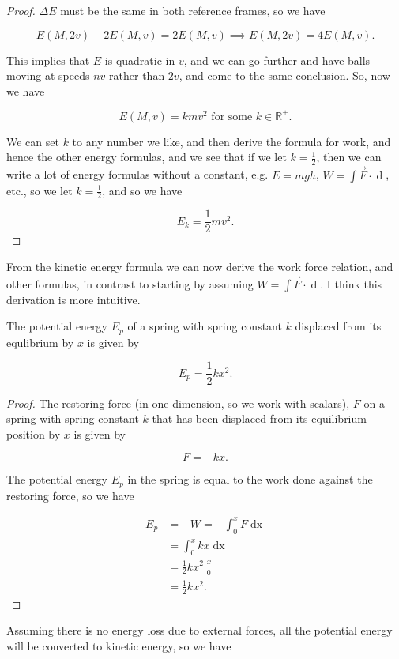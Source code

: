 \documentclass{homework}
\begin{document}
\begin{proof}
$\Delta E$ must be the same in both reference frames, so we have

\begin{equation*}
    E(M, 2v) - 2E(M, v) = 2E(M, v) \implies E(M, 2v) = 4E(M, v).
\end{equation*}

This implies that $E$ is quadratic in $v$, and we can go further and have balls moving at speeds $nv$ rather than $2v$, and come to the same conclusion. So, now we have

\begin{equation*}
    E(M, v) = kmv^2 \text{ for some $k\in\mathbb{R^+}$}.
\end{equation*}

We can set $k$ to any number we like, and then derive the formula for work, and hence the other energy formulas, and we see that if we let $k = \frac{1}{2}$, then we can write a lot of energy formulas without a constant, e.g. $E = mgh$, $W = \int \vec{F} \cdot \mathop{d\vec{r}}$, etc., so we let $k = \frac{1}{2}$, and so we have

\begin{equation*}
    E_k = \frac{1}{2}mv^2.
\end{equation*}
\end{proof}
From the kinetic energy formula we can now derive the work force relation, and other formulas, in contrast to starting by assuming $W = \int \vec{F} \cdot \mathop{d\vec{r}}$. I think this derivation is more intuitive.

The potential energy $E_p$ of a spring with spring constant $k$ displaced from its equlibrium by $x$ is given by

\begin{equation*}
    E_p = \frac{1}{2}kx^2.
\end{equation*}
\begin{proof}
The restoring force (in one dimension, so we work with scalars), $F$ on a spring with spring constant $k$ that has been displaced from its equilibrium position by $x$ is given by

\begin{equation*}
    F = -kx.
\end{equation*}

The potential energy $E_p$ in the spring is equal to the work done against the restoring force, so we have

\begin{align*}
    E_p &= -W = -\int_0^x F \mathop{dx} \\
    &= \int_0^x kx \mathop{dx} \\
    &= \frac{1}{2}kx^2\big\rvert_0^x \\
    &= \frac{1}{2}kx^2.
\end{align*}
\end{proof}
Assuming there is no energy loss due to external forces, all the potential energy will be converted to kinetic energy, so we have
\end{document}
